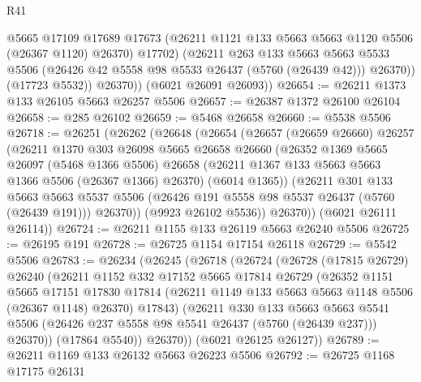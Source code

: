 \begin{lexlean}{R41}
\begin{coremodule}
                @5665
                @17109
                @17689
                @17673
                (@26211 @1121 @133 @5663 @5663 @1120 @5506 (@26367 @1120) @26370)
                @17702)
              (@26211
                @263
                @133
                @5663
                @5663
                @5533
                @5506
                (@26426 @42 @5558 @98 @5533 @26437 (@5760 (@26439 @42)))
                @26370))
            (@17723 @5532))
          @26370))
      (@6021 @26091 @26093))
@26654 := @26211 @1373 @133 @26105 @5663 @26257 @5506
@26657 := @26387 @1372 @26100 @26104
@26658 := @285 @26102
@26659 := @5468 @26658
@26660 := @5538 @5506
@26718 := @26251
    (@26262
      (@26648
        (@26654
          (@26657
            (@26659 @26660)
            @26257
            (@26211
              @1370
              @303
              @26098
              @5665
              @26658
              @26660
              (@26352
                @1369
                @5665
                @26097
                (@5468 @1366 @5506)
                @26658
                (@26211 @1367 @133 @5663 @5663 @1366 @5506 (@26367 @1366) @26370)
                (@6014 @1365))
              (@26211
                @301
                @133
                @5663
                @5663
                @5537
                @5506
                (@26426 @191 @5558 @98 @5537 @26437 (@5760 (@26439 @191)))
                @26370))
            (@9923 @26102 @5536))
          @26370))
      (@6021 @26111 @26114))
@26724 := @26211 @1155 @133 @26119 @5663 @26240 @5506
@26725 := @26195 @191
@26728 := @26725 @1154 @17154 @26118
@26729 := @5542 @5506
@26783 := @26234
    (@26245
      (@26718
        (@26724
          (@26728
            (@17815 @26729)
            @26240
            (@26211
              @1152
              @332
              @17152
              @5665
              @17814
              @26729
              (@26352
                @1151
                @5665
                @17151
                @17830
                @17814
                (@26211 @1149 @133 @5663 @5663 @1148 @5506 (@26367 @1148) @26370)
                @17843)
              (@26211
                @330
                @133
                @5663
                @5663
                @5541
                @5506
                (@26426 @237 @5558 @98 @5541 @26437 (@5760 (@26439 @237)))
                @26370))
            (@17864 @5540))
          @26370))
      (@6021 @26125 @26127))
@26789 := @26211 @1169 @133 @26132 @5663 @26223 @5506
@26792 := @26725 @1168 @17175 @26131

\end{coremodule}
\end{lexlean}
